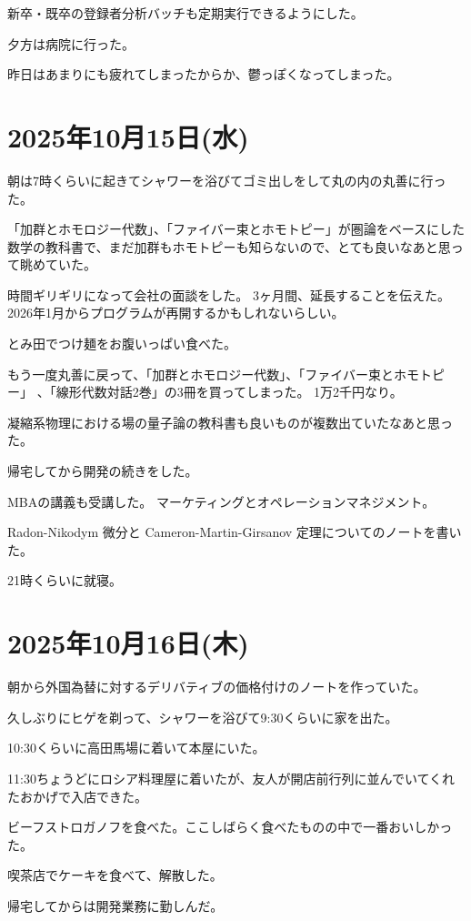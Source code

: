 \documentclass[uplatex]{jsarticle}
\begin{document}
新卒・既卒の登録者分析バッチも定期実行できるようにした。

夕方は病院に行った。

昨日はあまりにも疲れてしまったからか、鬱っぽくなってしまった。

\section{2025年10月15日(水)}

朝は7時くらいに起きてシャワーを浴びてゴミ出しをして丸の内の丸善に行った。

「加群とホモロジー代数」、「ファイバー束とホモトピー」が圏論をベースにした数学の教科書で、まだ加群もホモトピーも知らないので、とても良いなあと思って眺めていた。

時間ギリギリになって会社の面談をした。
3ヶ月間、延長することを伝えた。
2026年1月からプログラムが再開するかもしれないらしい。

とみ田でつけ麺をお腹いっぱい食べた。

もう一度丸善に戻って、「加群とホモロジー代数」、「ファイバー束とホモトピー」 、「線形代数対話2巻」の3冊を買ってしまった。
1万2千円なり。

凝縮系物理における場の量子論の教科書も良いものが複数出ていたなあと思った。

帰宅してから開発の続きをした。

MBAの講義も受講した。
マーケティングとオペレーションマネジメント。

Radon-Nikodym 微分と Cameron-Martin-Girsanov 定理についてのノートを書いた。

21時くらいに就寝。

\section{2025年10月16日(木)}

朝から外国為替に対するデリバティブの価格付けのノートを作っていた。

久しぶりにヒゲを剃って、シャワーを浴びて9:30くらいに家を出た。

10:30くらいに高田馬場に着いて本屋にいた。

11:30ちょうどにロシア料理屋に着いたが、友人が開店前行列に並んでいてくれたおかげで入店できた。

ビーフストロガノフを食べた。ここしばらく食べたものの中で一番おいしかった。

喫茶店でケーキを食べて、解散した。

帰宅してからは開発業務に勤しんだ。
\end{document}
